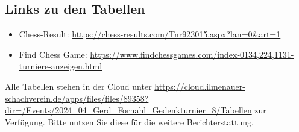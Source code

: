 \documentclass[a4paper,ngerman]{tui-algo-seminar}
\begin{document}
\subsection{Links zu den Tabellen}
\begin{itemize}
    \item Chess-Result: \url{https://chess-results.com/Tnr923015.aspx?lan=0&art=1}
    \item Find Chess Game: \url{https://www.findchessgames.com/index-0134,224,1131-turniere-anzeigen.html}
\end{itemize}


Alle Tabellen stehen in der Cloud unter \url{https://cloud.ilmenauer-schachverein.de/apps/files/files/89358?dir=/Events/2024_04_Gerd_Fornahl_Gedenkturnier_8/Tabellen} zur Verfügung. Bitte nutzen Sie diese für die weitere Berichterstattung. 
\end{document}
